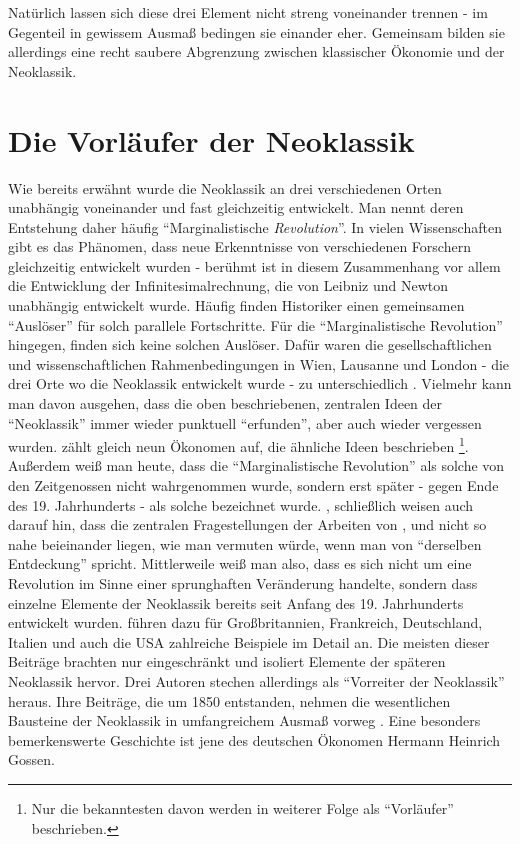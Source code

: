 Natürlich lassen sich diese drei Element nicht streng voneinander trennen - im Gegenteil in gewissem Ausmaß bedingen sie einander eher. Gemeinsam bilden sie allerdings eine recht saubere Abgrenzung zwischen klassischer Ökonomie und der Neoklassik.


\section{Die Vorläufer der Neoklassik}
\label{Vorläufer}

Wie bereits erwähnt wurde die Neoklassik an drei verschiedenen Orten unabhängig voneinander und fast gleichzeitig entwickelt. Man nennt deren Entstehung daher häufig "`Marginalistische \textit{Revolution}"'. In vielen Wissenschaften gibt es das Phänomen, dass neue Erkenntnisse von verschiedenen Forschern gleichzeitig entwickelt wurden - berühmt ist in diesem Zusammenhang vor allem die Entwicklung der Infinitesimalrechnung, die von Leibniz und Newton unabhängig entwickelt wurde. Häufig finden Historiker einen gemeinsamen "`Auslöser"' für solch parallele Fortschritte. Für die "`Marginalistische Revolution"' hingegen, finden sich keine solchen Auslöser. Dafür waren die gesellschaftlichen und wissenschaftlichen Rahmenbedingungen in Wien, Lausanne und London - die drei Orte wo die Neoklassik entwickelt wurde - zu unterschiedlich \parencite[S. 269]{Blaug1973}. Vielmehr kann man davon ausgehen, dass die oben beschriebenen, zentralen Ideen der "`Neoklassik"' immer wieder punktuell "`erfunden"', aber auch wieder vergessen wurden. \textcite[S. 274]{Blaug1973} zählt gleich neun Ökonomen auf, die ähnliche Ideen beschrieben \footnote{Nur die bekanntesten davon werden in weiterer Folge als "`Vorläufer"' beschrieben.}. Außerdem weiß man heute, dass die "`Marginalistische Revolution"' als solche von den Zeitgenossen nicht wahrgenommen wurde, sondern erst später - gegen Ende des 19. Jahrhunderts - als solche bezeichnet wurde. \textcite[S. 338]{Hicks1934}, \textcite[S. 516]{Jaffe1976} schließlich weisen auch darauf hin, dass die zentralen Fragestellungen der Arbeiten von \textcite{Menger1871}, \textcite{Jevons1871} und \textcite{Walras1874} nicht so nahe beieinander liegen, wie man vermuten würde, wenn man von "`derselben Entdeckung"' spricht. Mittlerweile weiß man also, dass es sich nicht um eine Revolution im Sinne einer sprunghaften Veränderung handelte, sondern dass einzelne Elemente der Neoklassik bereits seit Anfang des 19. Jahrhunderts entwickelt wurden. \textcite{Ekelund2002} führen dazu für Großbritannien, Frankreich, Deutschland, Italien und auch die USA zahlreiche Beispiele im Detail an. Die meisten dieser Beiträge brachten nur eingeschränkt und isoliert Elemente der späteren Neoklassik hervor. Drei Autoren stechen allerdings als "`Vorreiter der Neoklassik"' heraus. Ihre Beiträge, die um 1850 entstanden, nehmen die wesentlichen Bausteine der Neoklassik in umfangreichem Ausmaß vorweg \parencite[S. 205]{Ekelund2002}. Eine besonders bemerkenswerte Geschichte ist jene des deutschen Ökonomen Hermann Heinrich Gossen.

